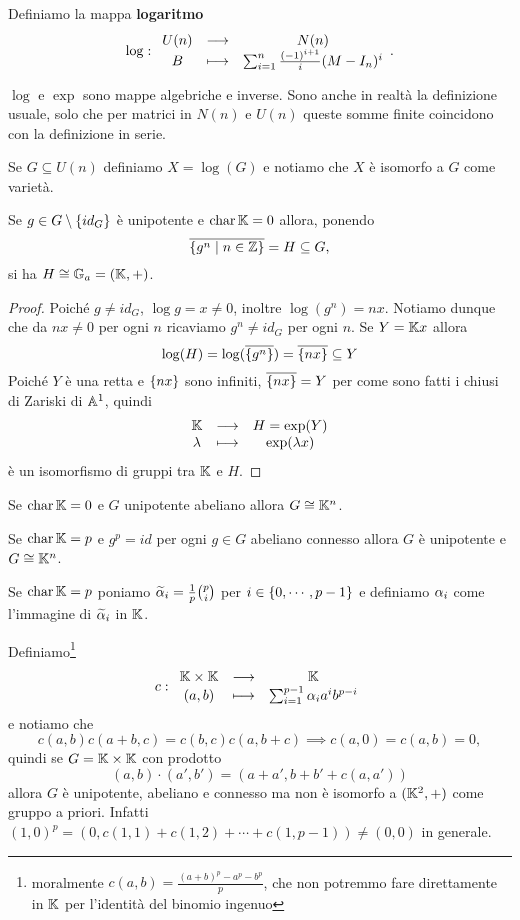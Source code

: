 \begin{definition}[Logaritmo]
Definiamo la mappa \textbf{logaritmo}
\[\log:\begin{array}{ccc} {U(n)} & \longrightarrow & {N(n)}\\ {B} & \longmapsto & {\sum_{i=1}^n\frac{(-1)^{i+1}}{i}(M-I_n)^i} \end{array}.\]
\end{definition}

\begin{remark}
$\log$ e $\exp$ sono mappe algebriche e inverse. Sono anche in realt\`a la definizione usuale, solo che per matrici in $N(n)$ e $U(n)$ queste somme finite coincidono con la definizione in serie.
\end{remark}

\begin{notation}
Se $G\subseteq U(n)$ definiamo $X=\log(G)$ e notiamo che $X$ \`e isomorfo a $G$ come variet\`a.
\end{notation}

\begin{proposition}\label{PrChiusuraDelGeneratoDaPotenzeDiElemento}
Se $g\in G\setminus\left\{ id_G\right\}$ \`e unipotente e $\operatorname{char} \mathbb{K}=0$ allora, ponendo
\[\overline{\left\{ g^n\mid n\in\mathbb{Z}\right\}}=H\subseteq G,\]
si ha $H\cong \mathbb{G}_a=(\mathbb{K},+)$.
\end{proposition}
\begin{proof}
Poich\'e $g\neq id_G$, $\log g=x\neq 0$, inoltre $\log(g^n)=nx$. Notiamo dunque che da $nx\neq 0$ per ogni $n$ ricaviamo $g^n\neq id_G$ per ogni $n$. Se $Y=\mathbb{K} x$ allora
\[\log(H)=\log(\overline{\left\{ g^n\right\}})=\overline{\left\{ nx\right\}}\subseteq Y\]
Poich\'e $Y$ \`e una retta e $\left\{ nx\right\}$ sono infiniti, $\overline{\left\{ nx\right\}}= Y$ per come sono fatti i chiusi di Zariski di $\mathbb{A}^1$, quindi 
\[\begin{array}{ccc} {\mathbb{K}} & \longrightarrow & {H=\exp(Y)}\\ {\lambda} & \longmapsto & {\exp(\lambda x)} \end{array}\]
\`e un isomorfismo di gruppi tra $\mathbb{K}$ e $H$.
\end{proof}

\begin{exercise}
Se $\operatorname{char} \mathbb{K}=0$ e $G$ unipotente abeliano allora $G\cong \mathbb{K}^n$.
\end{exercise}

\begin{fact}
Se $\operatorname{char} \mathbb{K}=p$ e $g^p=id$ per ogni $g\in G$ abeliano connesso allora $G$ \`e unipotente e $G\cong \mathbb{K}^n$.
\end{fact}

\begin{example}
Se $\operatorname{char} \mathbb{K}=p$ poniamo $\widetilde{\alpha}_i=\frac1p\binom pi$ per $i\in\left\{ 0,\cdots, p-1\right\}$ e definiamo $\alpha_i$ come l'immagine di $\widetilde{\alpha}_i$ in $\mathbb{K}$.

Definiamo\footnote{moralmente $c(a,b)=\frac{(a+b)^p-a^p-b^p}p$, che non potremmo fare direttamente in $\mathbb{K}$ per l'identit\`a del binomio ingenuo}
\[c:\begin{array}{ccc} {\mathbb{K}\times \mathbb{K}} & \longrightarrow & {\mathbb{K}}\\ {(a,b)} & \longmapsto & {\sum_{i=1}^{p-1} \alpha_i a^ib^{p-i}} \end{array}\]
e notiamo che
\[c(a,b)c(a+b,c)=c(b,c)c(a,b+c)\implies c(a,0)=c(a,b)=0,\]
quindi se $G=\mathbb{K}\times\mathbb{K}$ con prodotto
\[(a,b)\cdot(a',b')=(a+a',b+b'+c(a,a'))\]
allora $G$ \`e unipotente, abeliano e connesso ma non \`e isomorfo a $(\mathbb{K}^2,+)$ come gruppo a priori.
Infatti $(1,0)^p=(0,c(1,1)+c(1,2)+\cdots+c(1,p-1))\neq (0,0)$ in generale.
\end{example}

